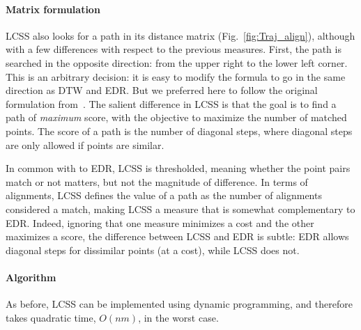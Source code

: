 \documentclass{interact}
\begin{document}
\paragraph*{Matrix formulation}
LCSS also looks for a path in its distance matrix (Fig.~\ref{fig:Traj_align}), although with a few differences with respect to the previous measures.
First, the path is searched in the opposite direction: from the upper right to the lower left corner. This is an arbitrary decision: it is easy to modify the formula to go in the same direction as DTW and EDR. But we preferred here to follow the original formulation from~\cite{VlachosGK02}.
The salient difference in LCSS is that the goal is to find a path of \emph{maximum} score, with the objective to maximize the number of matched points. The score of a path is the number of diagonal steps, where diagonal steps are only allowed if points are similar. 


In common with to EDR, LCSS is thresholded, meaning whether the point pairs match or not matters, but not the magnitude of difference. In terms of alignments, LCSS defines the value of a path as the number of alignments considered a match, making LCSS a measure that is somewhat complementary to EDR. Indeed, ignoring that one measure minimizes a cost and the other maximizes a score, the difference between LCSS and EDR is subtle: EDR allows diagonal steps for dissimilar points (at a cost), while LCSS does not. 

\paragraph*{Algorithm}
As before, LCSS can be implemented using dynamic programming, and therefore takes quadratic time, $O(nm)$, in the worst case.
\end{document}
